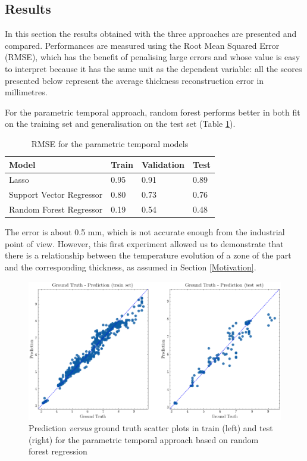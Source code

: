 \subsection{Results}

In this section the results obtained with the three approaches are presented and compared. Performances are measured using the Root Mean Squared Error (RMSE), which has the benefit of penalising large errors and whose value is easy to interpret because it has the same unit as the dependent variable: all the scores presented below represent the average thickness reconstruction error in millimetres.

For the parametric temporal approach, random forest performs better in both fit on the training set and generalisation on the test set (Table \ref{tab:Parametric Temporal_model_results}).
%
\begin{table}[h]
    \centering
    \caption{RMSE for the parametric temporal models}
    \begin{tabular}{llll}
     \toprule
    \textbf{Model} & \textbf{Train}  & \textbf{Validation}  & \textbf{Test}  \\
    \midrule
    Lasso & {0.95} & {0.91} & {0.89} \\
    Support Vector Regressor & {0.80} & {0.73} & {0.76} \\
    Random Forest Regressor & {0.19} & {0.54} & {0.48} \\
    \bottomrule
    \end{tabular}
    \label{tab:Parametric Temporal_model_results}
\end{table}
%
The error is about 0.5 mm, which is not accurate enough from the industrial point of view. However, this first experiment allowed us to demonstrate that there is a relationship between the temperature evolution of a zone of the part and the corresponding thickness, as assumed in  Section \ref{Motivation}.

\begin{figure}
\centering
\includegraphics[scale=0.48]{images/chapter_4/temporal_scatter.png}
\caption{Prediction \textit{versus} ground truth scatter plots in train (left) and test (right) for the parametric temporal approach based on random forest regression}
\label{fig:gt_prediction_functional}
\end{figure}

